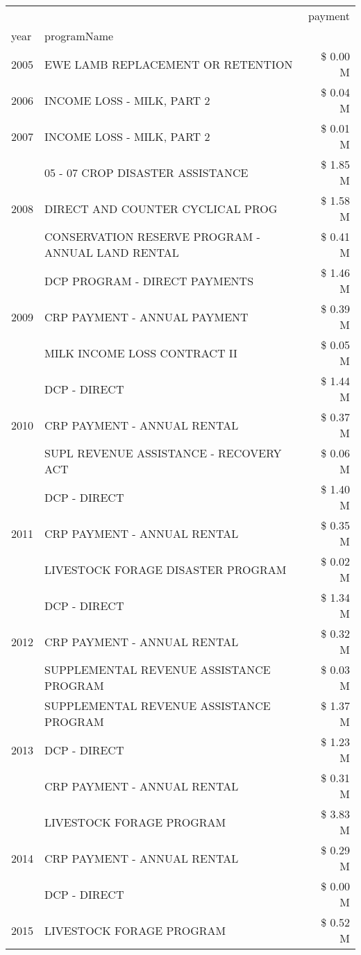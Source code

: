 \begin{tabular}{llr}
\toprule
 &  & payment \\
year & programName &  \\
\midrule
2005 & EWE LAMB REPLACEMENT OR RETENTION & \$ 0.00 M \\
\cline{1-3}
2006 & INCOME LOSS - MILK, PART 2 & \$ 0.04 M \\
\cline{1-3}
2007 & INCOME LOSS - MILK, PART 2 & \$ 0.01 M \\
\cline{1-3}
\multirow[t]{3}{*}{2008} & 05 - 07 CROP DISASTER ASSISTANCE & \$ 1.85 M \\
 & DIRECT AND COUNTER CYCLICAL PROG & \$ 1.58 M \\
 & CONSERVATION RESERVE PROGRAM - ANNUAL LAND RENTAL & \$ 0.41 M \\
\cline{1-3}
\multirow[t]{3}{*}{2009} & DCP PROGRAM - DIRECT PAYMENTS & \$ 1.46 M \\
 & CRP PAYMENT - ANNUAL PAYMENT & \$ 0.39 M \\
 & MILK INCOME LOSS CONTRACT II & \$ 0.05 M \\
\cline{1-3}
\multirow[t]{3}{*}{2010} & DCP - DIRECT & \$ 1.44 M \\
 & CRP PAYMENT - ANNUAL RENTAL & \$ 0.37 M \\
 & SUPL REVENUE ASSISTANCE - RECOVERY ACT & \$ 0.06 M \\
\cline{1-3}
\multirow[t]{3}{*}{2011} & DCP - DIRECT & \$ 1.40 M \\
 & CRP PAYMENT - ANNUAL RENTAL & \$ 0.35 M \\
 & LIVESTOCK FORAGE DISASTER PROGRAM & \$ 0.02 M \\
\cline{1-3}
\multirow[t]{3}{*}{2012} & DCP - DIRECT & \$ 1.34 M \\
 & CRP PAYMENT - ANNUAL RENTAL & \$ 0.32 M \\
 & SUPPLEMENTAL REVENUE ASSISTANCE PROGRAM & \$ 0.03 M \\
\cline{1-3}
\multirow[t]{3}{*}{2013} & SUPPLEMENTAL REVENUE ASSISTANCE PROGRAM & \$ 1.37 M \\
 & DCP - DIRECT & \$ 1.23 M \\
 & CRP PAYMENT - ANNUAL RENTAL & \$ 0.31 M \\
\cline{1-3}
\multirow[t]{3}{*}{2014} & LIVESTOCK FORAGE PROGRAM & \$ 3.83 M \\
 & CRP PAYMENT - ANNUAL RENTAL & \$ 0.29 M \\
 & DCP - DIRECT & \$ 0.00 M \\
\cline{1-3}
\multirow[t]{3}{*}{2015} & LIVESTOCK FORAGE PROGRAM & \$ 0.52 M \\

\end{tabular}
